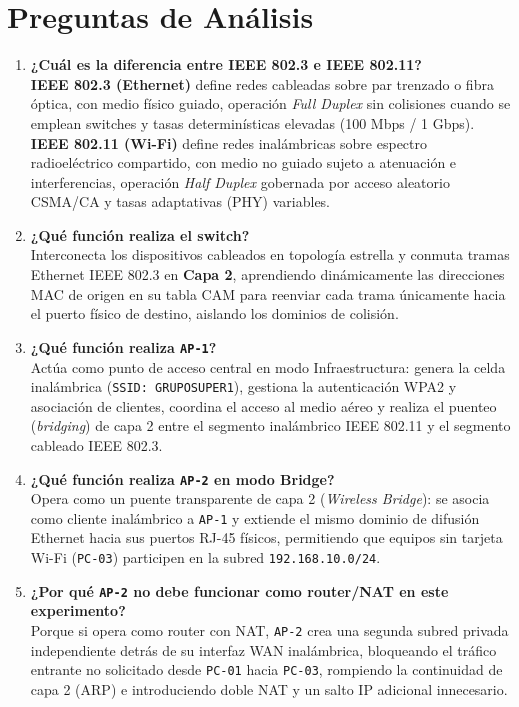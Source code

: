 \documentclass[11pt, a4paper]{article}
\begin{document}
\section{Preguntas de Análisis}

\begin{enumerate}
    \item \textbf{¿Cuál es la diferencia entre IEEE 802.3 e IEEE 802.11?} \\
    \textbf{IEEE 802.3 (Ethernet)} define redes cableadas sobre par trenzado o fibra óptica, con medio físico guiado, operación \textit{Full Duplex} sin colisiones cuando se emplean switches y tasas determinísticas elevadas (100 Mbps / 1 Gbps). \textbf{IEEE 802.11 (Wi-Fi)} define redes inalámbricas sobre espectro radioeléctrico compartido, con medio no guiado sujeto a atenuación e interferencias, operación \textit{Half Duplex} gobernada por acceso aleatorio CSMA/CA y tasas adaptativas (PHY) variables.
    \item \textbf{¿Qué función realiza el switch?} \\
    Interconecta los dispositivos cableados en topología estrella y conmuta tramas Ethernet IEEE 802.3 en \textbf{Capa 2}, aprendiendo dinámicamente las direcciones MAC de origen en su tabla CAM para reenviar cada trama únicamente hacia el puerto físico de destino, aislando los dominios de colisión.
    \item \textbf{¿Qué función realiza \texttt{AP-1}?} \\
    Actúa como punto de acceso central en modo Infraestructura: genera la celda inalámbrica (\texttt{SSID: GRUPOSUPER1}), gestiona la autenticación WPA2 y asociación de clientes, coordina el acceso al medio aéreo y realiza el puenteo (\textit{bridging}) de capa 2 entre el segmento inalámbrico IEEE 802.11 y el segmento cableado IEEE 802.3.
    \item \textbf{¿Qué función realiza \texttt{AP-2} en modo Bridge?} \\
    Opera como un puente transparente de capa 2 (\textit{Wireless Bridge}): se asocia como cliente inalámbrico a \texttt{AP-1} y extiende el mismo dominio de difusión Ethernet hacia sus puertos RJ-45 físicos, permitiendo que equipos sin tarjeta Wi-Fi (\texttt{PC-03}) participen en la subred \texttt{192.168.10.0/24}.
    \item \textbf{¿Por qué \texttt{AP-2} no debe funcionar como router/NAT en este experimento?} \\
    Porque si opera como router con NAT, \texttt{AP-2} crea una segunda subred privada independiente detrás de su interfaz WAN inalámbrica, bloqueando el tráfico entrante no solicitado desde \texttt{PC-01} hacia \texttt{PC-03}, rompiendo la continuidad de capa 2 (ARP) e introduciendo doble NAT y un salto IP adicional innecesario.

\end{enumerate}
\end{document}
